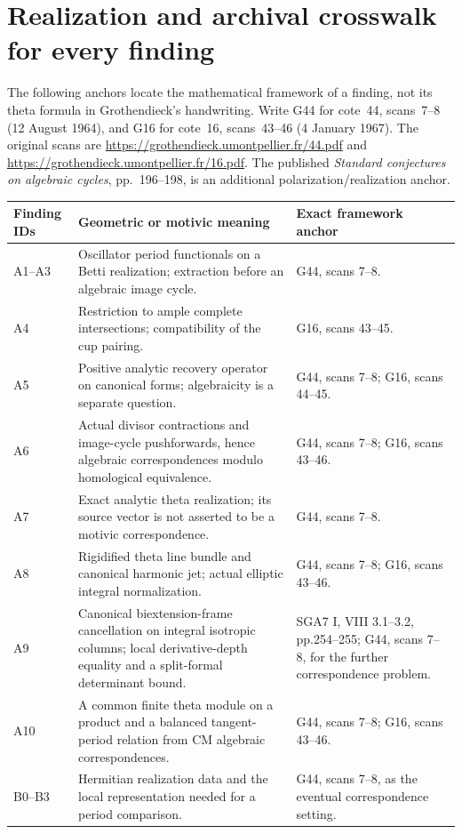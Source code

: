 \appendix
\section{Realization and archival crosswalk for every finding}

The following anchors locate the mathematical framework of a
finding, not its theta formula in Grothendieck's handwriting.
Write G44 for cote~44, scans~7--8 (12 August 1964), and G16 for
cote~16, scans~43--46 (4 January 1967). The original scans are
\url{https://grothendieck.umontpellier.fr/44.pdf} and
\url{https://grothendieck.umontpellier.fr/16.pdf}.
The published \emph{Standard conjectures on algebraic cycles},
pp.~196--198, is an additional polarization/realization anchor.

\begin{longtable}{@{}p{.18\linewidth}p{.48\linewidth}p{.27\linewidth}@{}}
\toprule Finding IDs & Geometric or motivic meaning & Exact framework anchor\\\midrule\endhead
A1--A3 & Oscillator period functionals on a Betti realization; extraction before an algebraic image cycle. & G44, scans 7--8.\\
A4 & Restriction to ample complete intersections; compatibility of the cup pairing. & G16, scans 43--45.\\
A5 & Positive analytic recovery operator on canonical forms; algebraicity is a separate question. & G44, scans 7--8; G16, scans 44--45.\\
A6 & Actual divisor contractions and image-cycle pushforwards, hence algebraic correspondences modulo homological equivalence. & G44, scans 7--8; G16, scans 43--46.\\
A7 & Exact analytic theta realization; its source vector is not asserted to be a motivic correspondence. & G44, scans 7--8.\\
A8 & Rigidified theta line bundle and canonical harmonic jet; actual elliptic integral normalization. & G44, scans 7--8; G16, scans 43--46.\\
A9 & Canonical biextension-frame cancellation on integral isotropic columns; local derivative-depth equality and a split-formal determinant bound. & SGA7 I, VIII 3.1--3.2, pp.254--255; G44, scans 7--8, for the further correspondence problem.\\
A10 & A common finite theta module on a product and a balanced tangent-period relation from CM algebraic correspondences. & G44, scans 7--8; G16, scans 43--46.\\
B0--B3 & Hermitian realization data and the local representation needed for a period comparison. & G44, scans 7--8, as the eventual correspondence setting.\\

\end{longtable}
